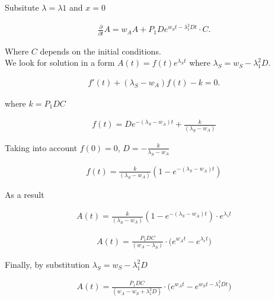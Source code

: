 \documentclass[10pt, oneside]{article}
\begin{document}
Subsitute  $\lambda = \lambda1$ and $x=0$
\begin{linenomath}
	\begin{align} 
	\frac{\partial}{\partial t} A = w_A A + P_1D e^{w_St-\lambda_1^{2}Dt} \cdot C .
	\end{align}
\end{linenomath}

Where $C$ depends on the initial conditions.\\
We look for solution in a form $A(t)=f(t)e^{\lambda_St}$ where $\lambda_S=w_S-\lambda_1^{2}D$.
\begin{linenomath}
	\begin{align} 
	f'(t)+(\lambda_S-w_A)f(t)-k = 0.
	\end{align}
\end{linenomath}
where $k=P_1DC$

\begin{linenomath}
	\begin{align} 
	f(t)=De^{-(\lambda_S-w_A)t}+\frac{k}{(\lambda_S-w_A)}
	\end{align}
\end{linenomath}

Taking into account $f(0)=0$, $D=-\frac{k}{\lambda_S-w_A}$

\begin{linenomath}
\begin{align} 
f(t)=\frac{k}{(\lambda_S-w_A)}\left( 1-e^{-(\lambda_S-w_A)t}\right)
\end{align}
\end{linenomath}

As a result
\begin{linenomath}
	\begin{align} 
	A(t)=\frac{k}{(\lambda_S-w_A)}\left( 1-e^{-(\lambda_S-w_A)t}\right)\cdot e^{\lambda_st}
	\end{align}
\end{linenomath}


\begin{linenomath}
	\begin{align} 
	A(t)=\frac{P_1DC}{(w_A-\lambda_S)}\cdot \big(e^{w_At}-e^{\lambda_st}\big)
	\end{align}
\end{linenomath}

Finally, by substitution $\lambda_S=w_S-\lambda_1^{2}D$

\begin{linenomath}
	\begin{align} 
	A(t)=\frac{P_1DC}{(w_A-w_S+\lambda_1^{2}D)}\cdot \big(e^{w_At}-e^{w_St-\lambda_1^{2}Dt}\big)
	\end{align}
\end{linenomath}
\end{document}
